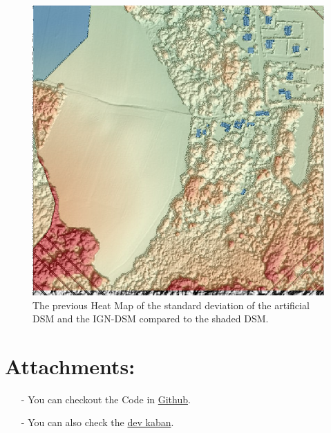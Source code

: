 \documentclass[a4paper, 11pt]{article}
\begin{document}
	\begin{figure}[H]
		\begin{center}
			\caption{\label{img::heatmap_shading} The previous Heat Map of the standard deviation of the artificial DSM and the IGN-DSM compared to the shaded DSM.}
			\includegraphics[scale=.4]{images/raster/elancourt/shaded_dsm_heat.png}
		\end{center}
	\end{figure}
	\section*{Attachments:}
	
	\begin{itemize}
		\item[-] You can checkout the Code in \href{https://github.com/Ethiy/3DSceneModel}{Github}.
		\item[-] You can also check the \href{https://github.com/Ethiy/3DSceneModel/projects/1}{dev kaban}.
	\end{itemize}
	
\end{document}
